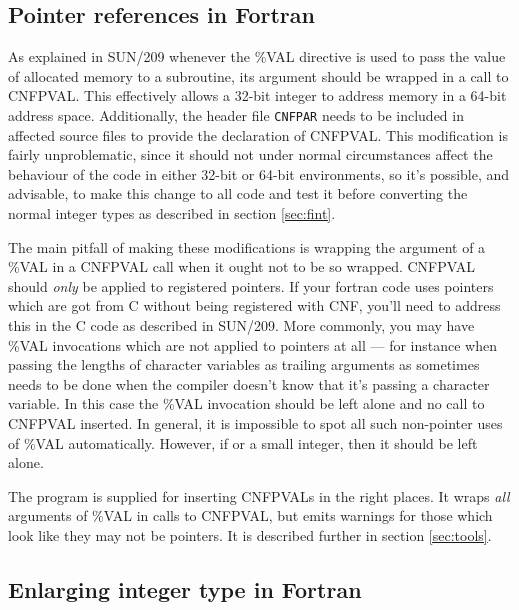 \documentclass[twoside,11pt]{article}
\newcommand{\xref}[3]{#1}
\renewcommand{\_}{\texttt{\symbol{95}}}
\begin{document}
\subsection{Pointer references in Fortran}

As explained in \xref{SUN/209}{sun209}{pointers} 
whenever the \%VAL directive is used to pass the value of allocated
memory to a subroutine, its argument should be wrapped in a call
to \xref{CNF\_PVAL}{sun209}{CNF\_PVAL}.  This effectively allows
a 32-bit integer to address memory in a 64-bit address space.
Additionally, the header file {\tt CNF\_PAR} needs to be included
in affected source files to provide the declaration of CNF\_PVAL.
This modification is fairly unproblematic, 
since it should not under normal
circumstances affect the behaviour of the code in either 32-bit or
64-bit environments, so it's possible, and advisable, to make this
change to all code and test it before converting the normal integer types
as described in section \ref{sec:fint}.  

The main pitfall of making these modifications is
wrapping the argument of a \%VAL in a CNF\_PVAL call when it ought
not to be so wrapped.
CNF\_PVAL should {\em only\/} be applied to registered pointers.
If your fortran code uses pointers which are got from C without 
being registered with CNF, you'll need to address this in the C code 
as described in \xref{SUN/209}{sun209}{pointers}.
More commonly, you may have \%VAL invocations which are not
applied to pointers at all --- for instance when passing 
the lengths of character variables as trailing arguments 
as sometimes needs to be done when the compiler doesn't know that
it's passing a character variable.  In this case the \%VAL 
invocation should be left alone and no call to CNF\_PVAL inserted.
In general, it is impossible to spot all such non-pointer uses
of \%VAL automatically.  However, if %
or a small integer, then it should be left alone.

The program  is supplied for inserting CNF\_PVALs
in the right places.  It wraps {\em all\/} arguments of \%VAL 
in calls to CNF\_PVAL, but emits warnings for those which look like
they may not be pointers.  It is described further in section 
\ref{sec:tools}.


\subsection{Enlarging integer type in Fortran\label{sec:fint}}
\end{document}
